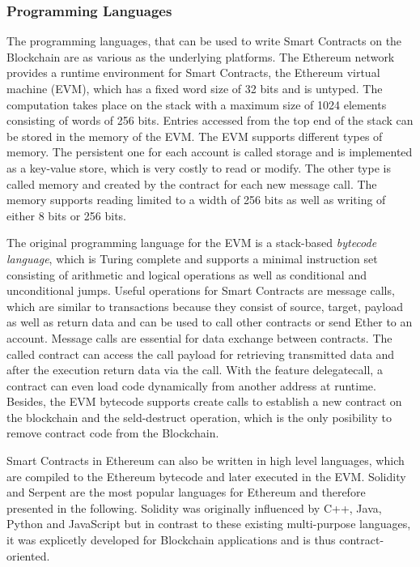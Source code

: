 \documentclass[conference]{IEEEtran}
\begin{document}
\subsubsection{Programming Languages}
The programming languages, that can be used to write Smart Contracts on the Blockchain are as various as the underlying platforms. The Ethereum network provides a runtime environment for Smart Contracts, the Ethereum virtual machine (EVM), which has a fixed word size of 32 bits and is untyped. The computation takes place on the stack with a maximum size of 1024 elements consisting of words of 256 bits. Entries accessed from the top end of the stack can be stored in the memory of the EVM. The EVM supports different types of memory. The persistent one for each account is called storage and is implemented as a key-value store, which is very costly to read or modify. The other type is called memory and created by the contract for each new message call. The memory supports reading limited to a width of 256 bits as well as writing of either 8 bits or 256 bits. \cite{Solidity2017} \par 
The original programming language for the EVM is a stack-based \textit{bytecode language}, which is Turing complete and supports a minimal instruction set consisting of arithmetic and logical operations as well as conditional and unconditional jumps. Useful operations for Smart Contracts are message calls, which are similar to transactions because they consist of source, target, payload as well as return data and can be used to call other contracts or send Ether to an account. Message calls are essential for data exchange between contracts. The called contract can access the call payload for retrieving transmitted data and after the execution return data via the call. With the feature delegatecall, a contract can even load code dynamically from another address at runtime. Besides, the EVM bytecode supports create calls to establish a new contract on the blockchain and the seld-destruct operation, which is the only posibility to remove contract code from the Blockchain. \cite{Bartoletti2017} \cite{McAdams2017} \cite{Solidity2017}\par 

Smart Contracts in Ethereum can also be written in high level languages, which are compiled to the Ethereum bytecode and later executed in the EVM. Solidity and Serpent are the most popular languages for Ethereum and therefore presented in the following. Solidity was originally influenced by C++, Java, Python and JavaScript but in contrast to these existing multi-purpose languages, it was explicetly developed for Blockchain applications and is thus contract-oriented. 
\end{document}
